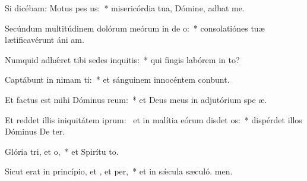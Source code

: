 \item Si dicébam: Motus  pes us:~* misericórdia tua, Dómine, adbat me.
\item Secúndum multitúdinem dolórum meórum in de o:~* consolatiónes tuæ lætificavérunt áni am.
\item Numquid adhǽret tibi sedes inquitis:~* qui fingis labórem in to?
\item Captábunt in nimam ti:~* et sánguinem innocéntem conbunt.
\item Et factus est mihi Dóminus  reum:~* et Deus meus in adjutórium spe æ.
\item Et reddet illis iniquitátem iprum:~\pscross{} et in malítia eórum disdet os:~* dispérdet illos Dóminus De ter.
\item Glória tri, et o,~* et Spirítu to.
\item Sicut erat in princípio, et , et per,~* et in sǽcula sæculó. men.
